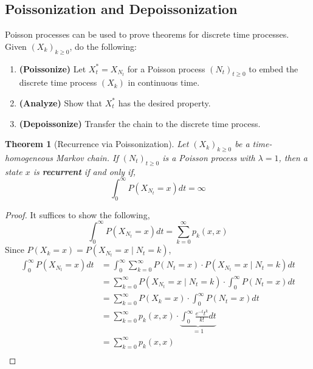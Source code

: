 \documentclass{tufte-handout}
\newtheorem{thm}{Theorem}
\begin{document}
\subsection{Poissonization and Depoissonization}
Poisson processes can be used to prove theorems for discrete time processes. Given $(X_k)_{k \geq 0}$, do the following:
\begin{enumerate}
  \item \textbf{(Poissonize)} Let $X_t^* = X_{N_t}$ for a Poisson process $(N_t)_{t \geq 0}$ to embed the discrete time process $(X_k)$ in continuous time.
  \item \textbf{(Analyze)} Show that $X^*_t$ has the desired property.
  \item \textbf{(Depoissonize)} Transfer the chain to the discrete time process.
\end{enumerate}

\begin{thm}[Recurrence via Poissonization]
  Let $(X_k)_{k \geq 0}$ be a time-homogeneous Markov chain. If $(N_t)_{t \geq 0}$ is a Poisson process with $\lambda = 1$, then a state $x$ is \textbf{recurrent} if and only if,
  \[\int_{0}^{\infty} P\left(X_{N_{t}}=x\right) d t=\infty\]
\end{thm}

\begin{proof}
  It suffices to show the following,
  \[\int_{0}^{\infty} P\left(X_{N_{t}}=x\right) d t = \sum_{k=0}^{\infty} p_k(x,x)\]
  \noindent Since $P\left(X_{k}=x\right) = P\left(X_{N_{t}}=x \mid N_{t}=k\right)$,
  \begin{align*}
    \int_{0}^{\infty} P\left(X_{N_{t}}=x\right) d t 
    &= \int_{0}^{\infty} \sum_{k=0}^{\infty} P(N_t = x) \cdot P\left(X_{N_{t}}=x \mid N_{t}=k\right) d t \\
    &= \sum_{k=0}^{\infty} P\left(X_{N_{t}}=x \mid N_{t}=k\right) \cdot \int_{0}^{\infty} P(N_t = x) d t \\
    &= \sum_{k=0}^{\infty} P\left(X_{k}=x\right) \cdot \int_{0}^{\infty} P(N_t = x) d t \\
    &= \sum_{k=0}^{\infty} p_k(x,x) \cdot \underbrace{\int_{0}^{\infty} \frac{e^{-t} t^{k}}{k !} d t}_{= 1} \\
      &=\sum_{k=0}^{\infty} p_k(x,x) \\
  \end{align*}
\end{proof}
\end{document}
